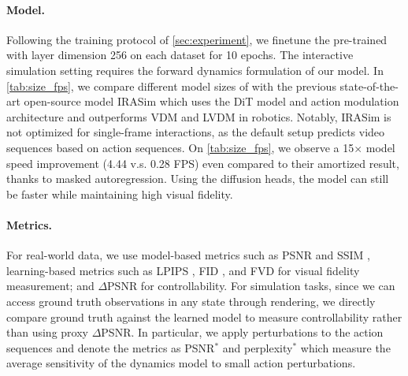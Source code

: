 \paragraph{Model.} Following the training protocol of \cref{sec:experiment}, we finetune the pre-trained \ourshort with layer dimension 256 on each dataset for 10 epochs. The interactive simulation setting requires the forward dynamics formulation of our model. In \cref{tab:size_fps}, we compare different model sizes of \ourshort with the previous state-of-the-art open-source model IRASim \cite{zhu2024irasim} which uses the DiT \cite{peebles2023scalable} model and action modulation architecture and outperforms VDM and LVDM \cite{he2022latent,
ho2022video} in robotics. Notably, IRASim is not optimized for single-frame interactions, as the default setup predicts video sequences based on action sequences. On \cref{tab:size_fps}, we observe a 15$\times$ model speed improvement (4.44 v.s. 0.28 FPS) even compared to their amortized result, thanks to masked autoregression. Using the diffusion heads, the model can still be faster while maintaining high visual fidelity.

\paragraph{Metrics.} For real-world data, we use model-based metrics such as PSNR \cite{hore2010image} and SSIM \cite{wang2004image}, learning-based metrics such as LPIPS \cite{zhang2018perceptual}, FID \cite{heusel2017gans}, and FVD \cite{unterthiner2018towards} for visual fidelity measurement; and $\Delta$PSNR \cite{bruce2024genie} for controllability. For simulation tasks, since we can access ground truth observations in any state through rendering, we directly compare ground truth against the learned model to measure controllability rather than using proxy $\Delta$PSNR. In particular, we apply perturbations to the action sequences and denote the metrics as PSNR$^*$ and perplexity$^*$ which measure the average sensitivity of the dynamics model to small action perturbations.

